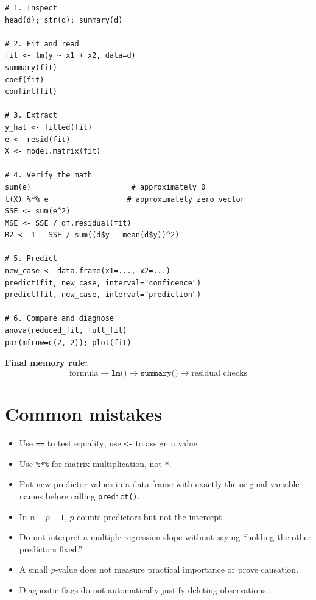 \documentclass[11pt]{article}
\begin{document}
\begin{lstlisting}
# 1. Inspect
head(d); str(d); summary(d)

# 2. Fit and read
fit <- lm(y ~ x1 + x2, data=d)
summary(fit)
coef(fit)
confint(fit)

# 3. Extract
y_hat <- fitted(fit)
e <- resid(fit)
X <- model.matrix(fit)

# 4. Verify the math
sum(e)                       # approximately 0
t(X) %*% e                  # approximately zero vector
SSE <- sum(e^2)
MSE <- SSE / df.residual(fit)
R2 <- 1 - SSE / sum((d$y - mean(d$y))^2)

# 5. Predict
new_case <- data.frame(x1=..., x2=...)
predict(fit, new_case, interval="confidence")
predict(fit, new_case, interval="prediction")

# 6. Compare and diagnose
anova(reduced_fit, full_fit)
par(mfrow=c(2, 2)); plot(fit)
\end{lstlisting}

\noindent\textbf{Final memory rule:}
\[
 \boxed{\text{formula} \longrightarrow \texttt{lm()}
 \longrightarrow \texttt{summary()}
 \longrightarrow \text{residual checks}}
\]

\section*{Common mistakes}
\begin{itemize}[leftmargin=*]
 \item Use \texttt{==} to test equality; use \texttt{<-} to assign a value.
 \item Use \texttt{\%*\%} for matrix multiplication, not \texttt{*}.
 \item Put new predictor values in a data frame with exactly the original
 variable names before calling \texttt{predict()}.
 \item In $n-p-1$, $p$ counts predictors but not the intercept.
 \item Do not interpret a multiple-regression slope without saying ``holding
 the other predictors fixed.''
 \item A small $p$-value does not measure practical importance or prove
 causation.
 \item Diagnostic flags do not automatically justify deleting observations.
\end{itemize}
\end{document}
